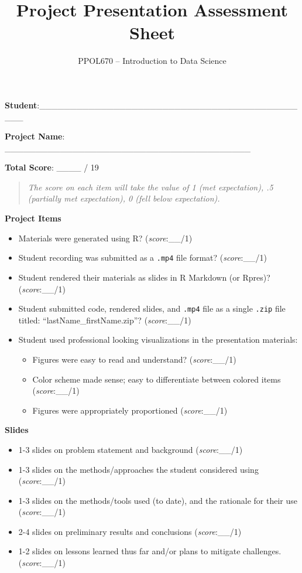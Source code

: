 \documentclass[
  11pt,
]{article}
\title{\textbf{Project Presentation Assessment Sheet}}
\author{\Large PPOL670 -- Introduction to Data Science}
\date{}
\providecommand{\tightlist}{%
  \setlength{\itemsep}{0pt}\setlength{\parskip}{0pt}}
\begin{document}
\maketitle

\textbf{Student}:\_\_\_\_\_\_\_\_\_\_\_\_\_\_\_\_\_\_\_\_\_\_\_\_\_\_\_\_\_\_\_\_\_\_\_\_\_\_\_\_\_\_\_\_\_

\textbf{Project Name}:
\_\_\_\_\_\_\_\_\_\_\_\_\_\_\_\_\_\_\_\_\_\_\_\_\_\_\_\_\_\_\_\_\_\_\_\_\_\_\_\_

\textbf{Total Score}: \_\_\_\_ / 19

\begin{quote}
\emph{The score on each item will take the value of 1 (met expectation),
.5 (partially met expectation), 0 (fell below expectation).}
\end{quote}

\textbf{Project Items}

\begin{itemize}
\item
  Materials were generated using R? (\emph{score}:\_\_/1)
\item
  Student recording was submitted as a \texttt{.mp4} file format?
  (\emph{score}:\_\_/1)
\item
  Student rendered their materials as slides in R Markdown (or Rpres)?
  (\emph{score}:\_\_/1)
\item
  Student submitted code, rendered slides, and \texttt{.mp4} file as a
  single \texttt{.zip} file titled: ``lastName\_firstName.zip''?
  (\emph{score}:\_\_/1)
\item
  Student used professional looking visualizations in the presentation
  materials:

  \begin{itemize}
  \tightlist
  \item
    Figures were easy to read and understand? (\emph{score}:\_\_/1)
  \item
    Color scheme made sense; easy to differentiate between colored items
    (\emph{score}:\_\_/1)
  \item
    Figures were appropriately proportioned (\emph{score}:\_\_/1)
  \end{itemize}
\end{itemize}

\textbf{Slides}

\begin{itemize}
\item
  1-3 slides on problem statement and background (\emph{score}:\_\_/1)
\item
  1-3 slides on the methods/approaches the student considered using
  (\emph{score}:\_\_/1)
\item
  1-3 slides on the methods/tools used (to date), and the rationale for
  their use (\emph{score}:\_\_/1)
\item
  2-4 slides on preliminary results and conclusions
  (\emph{score}:\_\_/1)
\item
  1-2 slides on lessons learned thus far and/or plans to mitigate
  challenges. (\emph{score}:\_\_/1)
\end{itemize}
\end{document}
